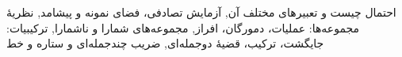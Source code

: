 \documentclass[a4paper,11pt,oneside,openany]{book}
\begin{document}
  {{احتمال چیست و تعبیرهای مختلف آن},
   {آزمایش تصادفی، فضای نمونه و پیشامد},
   {نظریهٔ مجموعه‌ها: عملیات، دمورگان، افراز},
   {مجموعه‌های شمارا و ناشمارا},
   {ترکیبیات: جایگشت، ترکیب، قضیهٔ دوجمله‌ای},
   {ضریب چندجمله‌ای و ستاره و خط}}

\mainmatter


\end{document}
